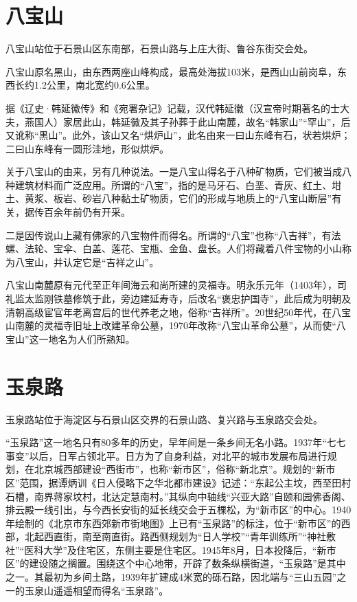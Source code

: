 \section{八宝山}
八宝山站位于石景山区东南部，石景山路与上庄大街、鲁谷东街交会处。

八宝山原名黑山，由东西两座山峰构成，最高处海拔103米，是西山山前岗阜，东西长约1.2公里，南北宽约0.6公里。

据《辽史·韩延徽传》和《宛署杂记》记载，汉代韩延徽（汉宣帝时期著名的士大夫，燕国人）家居此山，韩延徽及其子孙葬于此山南麓，故名“韩家山”“罕山”，后又讹称“黑山”。此外，该山又名“烘炉山”，此名由来一曰山东峰有石，状若烘炉；二曰山东峰有一圆形洼地，形似烘炉。

关于八宝山的由来，另有几种说法。一是八宝山得名于八种矿物质，它们被当成八种建筑材料而广泛应用。所谓的“八宝”，指的是马牙石、白垩、青灰、红土、坩土、黄浆、板岩、砂岩八种黏土矿物质，它们的形成与地质上的“八宝山断层”有关，据传百余年前仍有开采。

二是因传说山上藏有佛家的八宝物件而得名。所谓的“八宝”也称“八吉祥”，有法螺、法轮、宝伞、白盖、莲花、宝瓶、金鱼、盘长。人们将藏着八件宝物的小山称为八宝山，并认定它是“吉祥之山”。

八宝山南麓原有元代至正年间海云和尚所建的灵福寺。明永乐元年（1403年），司礼监太监刚铁墓修筑于此，旁边建延寿寺，后改名“褒忠护国寺”，此后成为明朝及清朝高级宦官年老离宫后的世代养老之地，俗称“吉祥所”。20世纪50年代，在八宝山南麓的灵福寺旧址上改建革命公墓，1970年改称“八宝山革命公墓”，从而使“八宝山”这一地名为人们所熟知。

\section{玉泉路}
玉泉路站位于海淀区与石景山区交界的石景山路、复兴路与玉泉路交会处。

“玉泉路”这一地名只有80多年的历史，早年间是一条乡间无名小路。1937年“七七事变”以后，日军占领北平。日方为了自身利益，对北平的城市发展布局进行规划，在北京城西部建设“西街市”，也称“新市区”，俗称“新北京”。规划的“新市区”范围，据谭炳训《日人侵略下之华北都市建设》记述：“东起公主坟，西至田村石槽，南界蒋家坟村，北达定慧南村。”其纵向中轴线“兴亚大路”自颐和园佛香阁、排云殿一线引出，与今西长安街的延长线交会于五棵松，为“新市区”的中心。1940年绘制的《北京市东西郊新市街地图》上已有“玉泉路”的标注，位于“新市区”的西部，北起西直街，南至南直街。路西侧规划为“日人学校”“青年训练所”“神社敷社”“医科大学”及住宅区，东侧主要是住宅区。1945年8月，日本投降后，“新市区”的建设随之搁置。围绕这个中心地带，开辟了数条纵横街道，“玉泉路”是其中之一。其最初为乡间土路，1939年扩建成4米宽的砾石路，因北端与“三山五园”之一的玉泉山遥遥相望而得名“玉泉路”。

